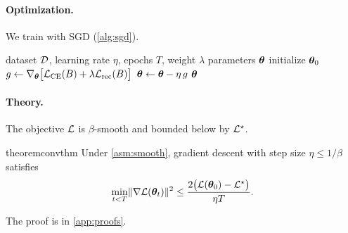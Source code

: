\paragraph{Optimization.} We train with SGD (\cref{alg:sgd}).

\begin{algorithm}[t]
  \caption{Training \method with mini-batch SGD}
  \label{alg:sgd}
  \begin{algorithmic}[1]
    \Require dataset $\mathcal{D}$, learning rate $\eta$, epochs $T$, weight $\lambda$
    \Ensure parameters $\bm{\theta}$
    \State initialize $\bm{\theta}_0$
        \State $g \gets \nabla_{\bm{\theta}} \bigl[\mathcal{L}_{\text{CE}}(B) + \lambda \mathcal{L}_{\text{rec}}(B)\bigr]$
        \State $\bm{\theta} \gets \bm{\theta} - \eta\, g$ 
      \EndFor
    \EndFor
    \State \Return $\bm{\theta}$
  \end{algorithmic}
\end{algorithm}

\paragraph{Theory.}

\begin{assumption}[Smoothness]\label{asm:smooth}
  The objective $\mathcal{L}$ is $\beta$-smooth and bounded below by $\mathcal{L}^\star$.
\end{assumption}

\begin{restatable}[Convergence]{theorem}{convthm}\label{thm:conv}
  Under \cref{asm:smooth}, gradient descent with step size $\eta \le 1/\beta$ satisfies
  \[
    \min_{t < T} \lVert\nabla \mathcal{L}(\bm{\theta}_t)\rVert^2 \le \frac{2\bigl(\mathcal{L}(\bm{\theta}_0) - \mathcal{L}^\star\bigr)}{\eta T}.
  \]
\end{restatable}

The proof is in \cref{app:proofs}.
